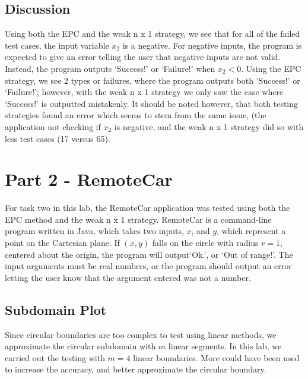 \documentclass[letterpaper]{article}
\begin{document}
\subsection{Discussion}
Using both the EPC and the weak n x 1 strategy, we see that for all of the
failed test cases, the input variable $x_2$ is a negative. For negative
inputs, the program is expected to give an error telling the user that 
negative inputs are not valid. Instead, the program outputs `Success!'
or `Failure!' when $x_2 < 0$. Using the EPC strategy, we see
2 types or failures, where the program outputs both `Success!'                       
or `Failure!'; however, with the weak n x 1 strategy we only saw the case where
`Success!' is outputted mistakenly. It should be noted however, that both
testing strategies found an error which seems to stem from the same issue,
(the application not checking if $x_2$ is negative, and the weak n x 1 strategy
did so with less test cases (17 versus 65).


\section*{Part 2 - RemoteCar}
For task two in this lab, the RemoteCar application was tested using both the
EPC method and the weak n x 1 strategy. RemoteCar is a command-line program
written in Java, which takes two inputs, $x$, and $y$, which represent a
point on the Cartesian plane.
If $(x,y)$ falls on the circle with radius $r=1$, centered about the origin,
the program will output`Ok.', or `Out of range!'. The input arguments must
be real numbers, or the program should output an error letting the user know
that the argument entered was not a number.

\subsection{Subdomain Plot}
Since circular boundaries are too complex to test using linear methods,
we approximate the circular subdomain with $m$ linear segments. In this lab,
we carried out the testing with $m=4$ linear boundaries. More could have been
used to increase the accuracy, and better approximate the circular boundary.
\end{document}
